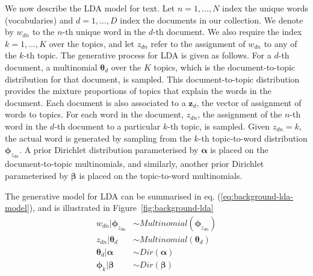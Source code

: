 We now describe the LDA model for text. Let $n=1,...,N$ index the unique words (vocabularies) and $d=1,...,D$ index the documents in our collection. We denote by $w_{dn}$ to the $n$-th unique word in the $d$-th document. We also require the index $k=1,...,K$ over the topics, and let $z_{dn}$ refer to the assignment of $w_{dn}$ to any of the $k$-th topic. The generative process for LDA is given as follows. For a $d$-th document, a multinomial $\boldsymbol{\theta}_{d}$ over the $K$ topics, which is the document-to-topic distribution for that document, is sampled. This document-to-topic distribution provides the mixture proportions of topics that explain the words in the document. Each document is also associated to a $\boldsymbol{z}_d$, the vector of assignment of words to topics. For each word in the document, $z_{dn}$, the assignment of the $n$-th word in the $d$-th document to a particular $k$-th topic, is sampled. Given $z_{dn}=k$, the actual word is generated by sampling from the $k$-th topic-to-word distribution $\boldsymbol{\phi}_{z_{dn}}$. A prior Dirichlet distribution parameterised by $\boldsymbol{\alpha}$ is placed on the document-to-topic multinomials, and similarly, another prior Dirichlet parameterised by $\boldsymbol{\beta}$ is placed on the topic-to-word multinomials. 

The generative model for LDA can be summarised in eq. (\ref{eq:background-lda-model}), and is illustrated in Figure~\ref{fig:background-lda}
\begin{equation}
\begin{aligned}
w_{dn} \vert \boldsymbol{\phi}_{z_{dn}} &\sim Multinomial(\boldsymbol{\phi}_{z_{dn}}) \\
z_{dn} \vert \boldsymbol{\theta}_{d}      &\sim Multinomial(\boldsymbol{\theta}_{d}) \\
\boldsymbol{\theta}_{d} \vert \boldsymbol{\alpha}                &\sim Dir(\boldsymbol{\alpha}) \\ 
\boldsymbol{\phi}_{k} \vert \boldsymbol{\beta}                     &\sim Dir(\boldsymbol{\beta})
\end{aligned}
\label{eq:background-lda-model}
\end{equation}


